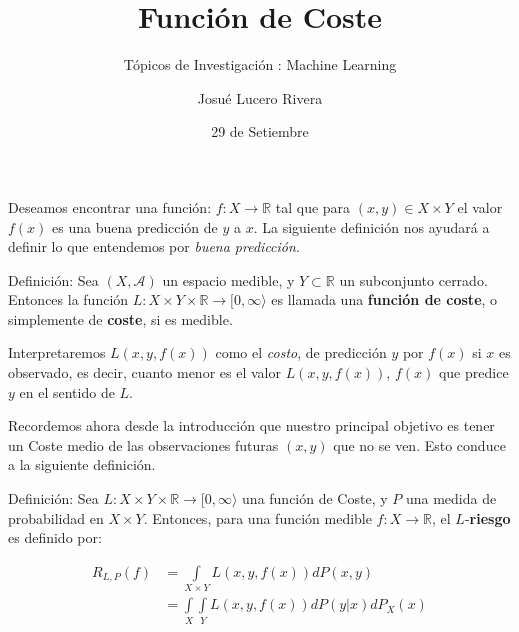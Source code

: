 \documentclass[utf8,spanish,xcolor={table,dvipsnames},12pt]{beamer}
\title[Función de Coste]{Función de  Coste}
\subtitle{Tópicos de Investigación : Machine Learning}
\author{Josué Lucero Rivera}
\institute[UNI]{Universidad Nacional de Ingeniería}
\date{29 de Setiembre}
\begin{document}
\begin{frame}
\maketitle
\end{frame}


\begin{frame}
Deseamos encontrar una función: $f:X\rightarrow \mathds{R}$ tal que para $(x,y) \in X\times Y$ el valor $f(x)$ es una buena predicción de $y$ a $x$. La siguiente definición nos ayudará a definir lo que entendemos por \textit{buena predicción}.
\end{frame}


\begin{frame}
\begin{block}{Definición:}
 Sea $(X,\mathcal{A})$ un espacio medible, y $Y\subset\mathds{R}$ un subconjunto cerrado. Entonces la función $L : X\times Y\times \mathds{R} \rightarrow [0,\infty\rangle$ es llamada una \textbf{función de coste}, o simplemente de \textbf{coste}, si es medible.
\end{block}
Interpretaremos $L(x,y,f(x))$ como el \textit{costo}, de predicción $y$ por $f(x)$ si $x$ es observado, es decir, cuanto menor es el valor $L(x,y,f(x))$,  $f(x)$ que predice $y$ en el sentido de $L$.

\vspace{0.2cm}

Recordemos ahora desde la introducción que nuestro principal objetivo es tener un  Coste medio de las observaciones futuras $(x,y)$ que no se ven. Esto conduce a la siguiente definición.
\end{frame}


\begin{frame}
\begin{block}{Definición:}
Sea $L : X\times Y\times \mathds{R} \rightarrow [0,\infty\rangle$ una función de Coste, y $P$ una medida de probabilidad en $X\times Y$. Entonces, para una función medible $f: X\rightarrow  \mathds{R}$, el $L$-\textbf{riesgo} es definido por:

    \begin{align*}
    R_{L,P}(f) & = \int\limits_{X\times Y}L(x,y,f(x))dP(x,y)\\
     & =\int\limits_{X}\int\limits_{Y}L(x,y,f(x))dP(y|x)dP_{X}(x)
    \end{align*}
\end{block}
\end{frame}
\end{document}
